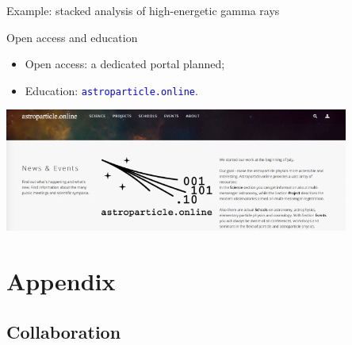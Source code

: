 \documentclass[18pt]{beamer}
\newcommand{\insimg}[1]{
\begin{tikzpicture}[remember picture,overlay]
  \node[xshift=-7.7ex,yshift=12ex] at (current page.south east){%
    \texttt{[image: pics/\#1]}
  };
\end{tikzpicture}
}
\begin{document}
\begin{frame}{Example: stacked analysis of high-energetic gamma rays}
 
\end{frame}

\begin{frame}{Open access and education}
\vspace{-4em}
\begin{itemize}
\item Open access: a dedicated portal planned;
\item Education: \textcolor{blue}{\texttt{astroparticle.online}}.
\end{itemize}
\centering
\includegraphics[width=0.85\textwidth]{pics/astro_onl.png}
\end{frame}



\appendix
\beginbackup

\section{Appendix}
\subsection{Collaboration}
\end{document}
